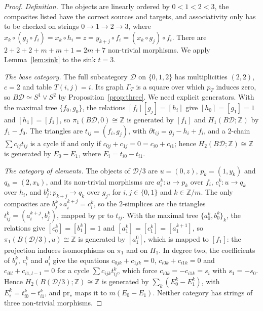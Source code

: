 \documentclass[12pt]{amsart}
\theoremstyle{definition}
\theoremstyle{remark}
\newcommand{\DD}{\mathcal{D}}
\newcommand{\co}{\colon}
\newcommand{\Z}{\mathbb{Z}}
\begin{document}
\begin{proof}
\emph{Definition.} The objects are linearly ordered by $0<1<2<3$, the composites listed have the correct sources and targets, and associativity only has to be checked on strings $0\to1\to2\to3$, where $x_k\circ(g_j\circ f_i)=x_k\circ h_i=z=y_{k+j}\circ f_i=(x_k\circ g_j)\circ f_i$. There are $2+2+2+m+m+1=2m+7$ non-trivial morphisms. We apply Lemma~\ref{lem:sink} to the sink $t=3$.

\emph{The base category.} The full subcategory $\DD$ on $\{0,1,2\}$ has multiplicities $(2,2)$, $c=2$ and table $T(i,j)=i$. Its graph $\Gamma_T$ is a square over which $p_T$ induces zero, so $B\DD\simeq S^1\vee S^2$ by Proposition~\ref{prop:three}. We need explicit generators. With the maximal tree $\{f_0,g_0\}$, the relations $[f_i][g_j]=[h_i]$ give $[h_0]=[g_1]=1$ and $[h_1]=[f_1]$, so $\pi_1(B\DD,0)\cong\Z$ is generated by $[f_1]$ and $H_1(B\DD;\Z)$ by $f_1-f_0$. The triangles are $t_{ij}=(f_i,g_j)$, with $\partial t_{ij}=g_j-h_i+f_i$, and a $2$-chain $\sum c_{ij}t_{ij}$ is a cycle if and only if $c_{0j}+c_{1j}=0=c_{i0}+c_{i1}$; hence $H_2(B\DD;\Z)\cong\Z$ is generated by $E_0-E_1$, where $E_i=t_{i0}-t_{i1}$.

\emph{The category of elements.} The objects of $\DD/3$ are $u=(0,z)$, $p_k=(1,y_k)$ and $q_k=(2,x_k)$, and its non-trivial morphisms are $a_i^k\co u\to p_k$ over $f_i$, $c_i^k\co u\to q_k$ over $h_i$, and $b_j^k\co p_{k+j}\to q_k$ over $g_j$, for $i,j\in\{0,1\}$ and $k\in\Z/m$. The only composites are $b_j^k\circ a_i^{k+j}=c_i^k$, so the $2$-simplices are the triangles $t_{ij}^k=(a_i^{k+j},b_j^k)$, mapped by $\mathrm{pr}$ to $t_{ij}$. With the maximal tree $\{a_0^k,b_0^k\}_{k}$, the relations give $[c_0^k]=[b_1^k]=1$ and $[a_1^k]=[c_1^k]=[a_1^{k+1}]$, so $\pi_1(B(\DD/3),u)\cong\Z$ is generated by $[a_1^0]$, which is mapped to $[f_1]$: the projection induces isomorphisms on $\pi_1$ and on $H_1$. In degree two, the coefficients of $b_j^k$, $c_i^k$ and $a_i^l$ give the equations $c_{0jk}+c_{1jk}=0$, $c_{i0k}+c_{i1k}=0$ and $c_{i0l}+c_{i1,l-1}=0$ for a cycle $\sum c_{ijk}t_{ij}^k$, which force $c_{i0k}=-c_{i1k}=s_i$ with $s_1=-s_0$. Hence $H_2(B(\DD/3);\Z)\cong\Z$ is generated by $\sum_k(E_0^k-E_1^k)$, with $E_i^k=t_{i0}^k-t_{i1}^k$, and $\mathrm{pr}_*$ maps it to $m(E_0-E_1)$. Neither category has strings of three non-trivial morphisms.


\end{proof}
\end{document}
